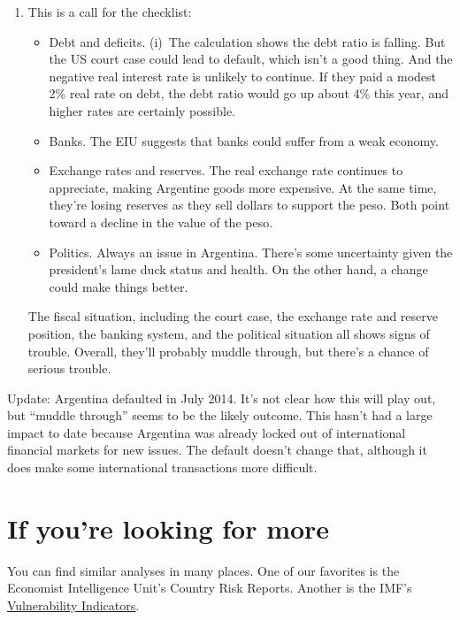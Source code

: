 \begin{enumerate}
\begin{enumerate}
\item This is a call for the checklist:
\begin{itemize}
\item Debt and deficits.
(i)~The calculation shows the debt ratio is falling.
But the US court case could lead to default,
which isn't a good thing.
And the negative real interest rate is unlikely to continue.
If they paid a modest 2\% real rate on debt, the debt ratio would
go up about 4\% this year,
and higher rates are certainly possible.

\item Banks.
The EIU suggests that banks could suffer from a weak economy.

\item Exchange rates and reserves.
The real exchange rate continues to appreciate, making
Argentine goods more expensive.
At the same time, they're losing reserves as they sell dollars to support the peso.
Both point toward a decline in the value of the peso.

\item Politics.  Always an issue in Argentina.
There's some uncertainty given the president's lame duck status and health.
On the other hand, a change could make things better.
\end{itemize}
%
The fiscal situation, including the court case, the exchange rate and reserve position,
the banking system, and the political situation all shows signs of trouble.
Overall, they'll probably muddle through,
but there's a chance of serious trouble.
\end{enumerate}
Update:  Argentina defaulted in July 2014.
It's not clear how this will play out, but ``muddle through'' seems to be the likely outcome.
This hasn't had a large impact to date because Argentina
was already locked out of international financial markets for new issues.
The default doesn't change that, although it does make some international
transactions more difficult.



\end{enumerate}
\setlength{\leftmargini}{\oldleftmargini}


\section*{If you're looking for more}

You can find similar analyses in many places.
One of our favorites is the
Economist Intelligence Unit's Country Risk Reports.
Another is the IMF's
\href{http://www.imf.org/external/np/exr/facts/vul.htm}
{Vulnerability Indicators}.

